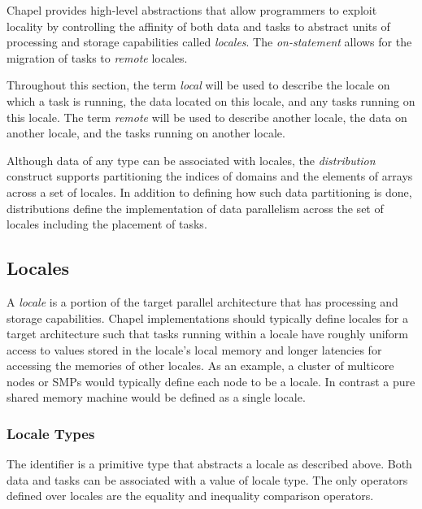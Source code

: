 \label{Locality_and_Distribution}

Chapel provides high-level abstractions that allow programmers to
exploit locality by controlling the affinity of both data and tasks to
abstract units of processing and storage capabilities
called \emph{locales}.  The \emph{on-statement} allows for the
migration of tasks to \emph{remote} locales.

Throughout this section, the term \emph{local} will be used to
describe the locale on which a task is running, the data located on
this locale, and any tasks running on this locale.  The
term \emph{remote} will be used to describe another locale, the data
on another locale, and the tasks running on another locale.

Although data of any type can be associated with locales, the {\em
distribution} construct supports partitioning the indices of domains
and the elements of arrays across a set of locales.  In addition to
defining how such data partitioning is done, distributions define the
implementation of data parallelism across the set of locales including
the placement of tasks.

\subsection{Locales}
\label{Locales}

A \emph{locale} is a portion of the target parallel architecture that
has processing and storage capabilities.  Chapel implementations
should typically define locales for a target architecture such that
tasks running within a locale have roughly uniform access to values
stored in the locale's local memory and longer latencies for accessing
the memories of other locales.  As an example, a cluster of multicore
nodes or SMPs would typically define each node to be a locale.  In
contrast a pure shared memory machine would be defined as a single
locale.

\subsubsection{Locale Types}
\label{The_Locale_Type}

The identifier  is a primitive type that abstracts a
locale as described above.  Both data and tasks can be associated with
a value of locale type. The only operators defined over locales are
the equality and inequality comparison operators.

